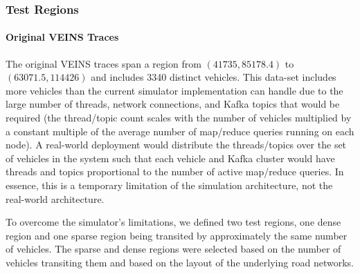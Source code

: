\documentclass{thesis}
\begin{document}

\subsubsection{Test Regions} %
    \paragraph{Original VEINS Traces}
        The original VEINS traces span a region from $(41735, 85178.4)$ to $(63071.5, 114426)$ and includes 3340 distinct
        vehicles. This data-set includes more vehicles than the current simulator implementation can handle due to the large
        number of threads, network connections, and Kafka topics that would be required (the thread/topic count scales with the
        number of vehicles multiplied by a constant multiple of the average number of map/reduce queries running on each node).
        A real-world deployment would distribute the threads/topics over the set of vehicles in the system such that each
        vehicle and Kafka cluster would have threads and topics proportional to the number of active map/reduce queries.
        In essence, this is a temporary limitation of the simulation architecture, not the real-world architecture.

        To overcome the simulator's limitations, we defined two test regions, one dense region and one sparse region
        being transited by approximately the same number of vehicles. The sparse and dense regions were selected based
        on the number of vehicles transiting them and based on the layout of the underlying road networks.
\end{document}
